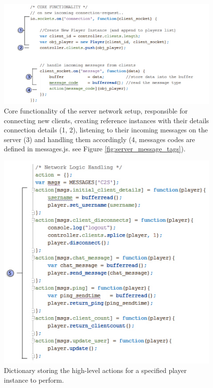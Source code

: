 \documentclass[bsc, 12pt, twoside, singlespacing, parskip, abbrevs, notimes, normalheadings, logo]{styles/infthesis}
\begin{document}
\begin{figure}[b!]
\includegraphics[scale=0.72]{images/server_code.jpg}
\caption{Core functionality of the server network setup, responsible for connecting new clients, creating reference instances with their details connection details (1, 2), listening to their incoming messages on the server (3) and handling them accordingly (4, messages codes are defined in messages.js. see Figure \ref{fig:server_message_tags}). }
\label{fig:server_core}
\end{figure}

\begin{figure}
\includegraphics[scale=0.65]{images/server_actions.jpg}
\caption{Dictionary storing the high-level actions for a specified player instance to perform.}
\label{fig:server_actions}
\end{figure}
\end{document}

